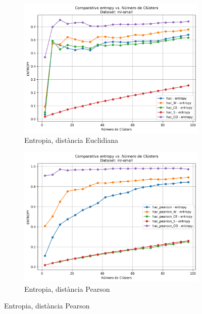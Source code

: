 \documentclass[a4paper,12pt]{report}
\begin{document}
\begin{figure}[H]
    \vspace{1em}

    \begin{subfigure}[b]{0.49\textwidth}
        \includegraphics[width=\textwidth]{Figuras/entropy-euc-ml-small.png}
        \caption{Entropia, distància Euclidiana}
        \label{fig:hac-clustering-e-results-e}
    \end{subfigure}
    \hfill
    \begin{subfigure}[b]{0.49\textwidth}
        \includegraphics[width=\textwidth]{Figuras/entropy-pear-ml-small.png}
        \caption{Entropia, distància Pearson}
        \label{fig:hac-clustering-e-results-f}
    \end{subfigure}


\end{figure}
\end{document}
